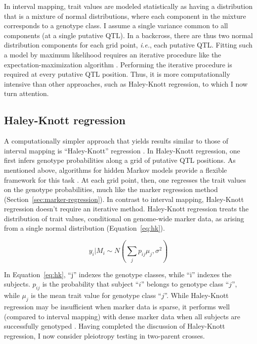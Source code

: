 \documentclass[oneside]{book}\usepackage[]{graphicx}\usepackage[]{color}
\begin{document}
In interval mapping, trait values are modeled statistically as having a 
distribution 
that is a mixture of normal distributions, where each component in the mixture 
corresponds to a genotype class. I assume a single variance common to all 
components (at a single 
putative QTL). In a backcross, there are thus two normal distribution 
components for 
each grid point, \emph{i.e.}, each putative QTL. Fitting such a model by 
maximum 
likelihood requires an iterative procedure like the expectation-maximization 
algorithm 
\citep{dempster1977maximum}. Performing the iterative procedure is required at every 
putative QTL position. Thus, it is more computationally intensive than other approaches, 
such as Haley-Knott regression, to which I now turn attention.


\subsection{Haley-Knott regression}\label{sec:haley-knott}

A computationally simpler approach that yields results similar to those of interval 
mapping is ``Haley-Knott'' regression \citep{haley1992simple, martinez1992estimating}. 
In Haley-Knott regression, one first infers genotype probabilities along a grid of 
putative QTL positions. As mentioned above, algorithms for hidden Markov models provide 
a flexible framework for this task \citep{broman2006use,broman2009guide}. At each grid point, then, one regresses the trait values on the genotype probabilities, much like the marker regression method (Section~\ref{sec:marker-regression}). In contrast to interval mapping, Haley-Knott regression doesn't require an iterative method. Haley-Knott regression treats the distribution of trait values, conditional on genome-wide marker data, as arising from a single normal distribution (Equation~\ref{eq:hk}). 

\begin{equation}
y_i|M_i \sim N(\sum_j p_{ij}\mu_j, \sigma^2)
\label{eq:hk}
\end{equation}

In Equation~\ref{eq:hk}, ``j'' indexes the genotype classes, while ``i'' indexes the subjects. $p_{ij}$ is the probability that subject ``$i$'' belongs to genotype class ``$j$'', while $\mu_j$ is the mean trait value for genotype class ``$j$''. While Haley-Knott regression may be insufficient when marker data is sparse, it performs well (compared to interval mapping) with dense marker data when all subjects are successfully genotyped \citep{broman2009guide}. Having completed the discussion of Haley-Knott regression, I now consider pleiotropy testing in two-parent crosses. 
\end{document}
